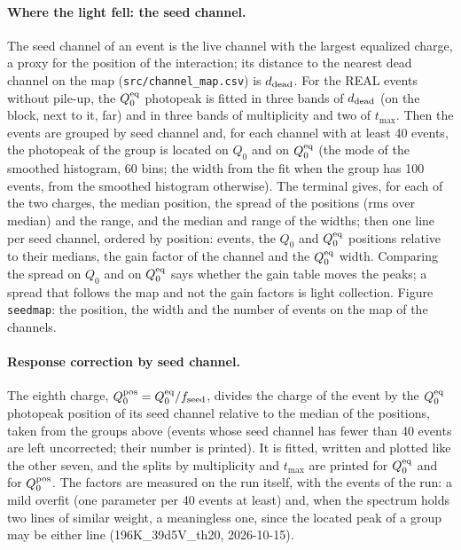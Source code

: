 \documentclass[11pt]{article}
\newcommand{\code}[1]{\texttt{#1}}
\begin{document}
\paragraph{Where the light fell: the seed channel.} The seed channel of
an event is the live channel with the largest equalized charge, a proxy
for the position of the interaction; its distance to the nearest dead
channel on the map (\code{src/channel\_map.csv}) is $d_{\rm dead}$. For
the REAL events without pile-up, the $Q^{\rm eq}_0$ photopeak is fitted in
three bands of $d_{\rm dead}$ (on the block, next to it, far) and in three
bands of multiplicity and two of $t_{\max}$. Then the events are grouped
by seed channel and, for each channel with at least 40 events, the
photopeak of the group is located on $Q_0$ and on $Q^{\rm eq}_0$ (the
mode of the smoothed histogram, 60 bins; the width from the fit when the
group has 100 events, from the smoothed histogram otherwise). The
terminal gives, for each of the two charges, the median position, the
spread of the positions (rms over median) and the range, and the median
and range of the widths; then one line per seed channel, ordered by
position: events, the $Q_0$ and $Q^{\rm eq}_0$ positions relative to
their medians, the gain factor of the channel and the $Q^{\rm eq}_0$
width. Comparing the spread on $Q_0$ and on $Q^{\rm eq}_0$ says whether
the gain table moves the peaks; a spread that follows the map and not the
gain factors is light collection. Figure \code{seedmap}: the position, the
width and the number of events on the map of the channels.

\paragraph{Response correction by seed channel.} The eighth charge,
$Q^{\rm pos}_0 = Q^{\rm eq}_0 / f_{\rm seed}$, divides the charge of the
event by the $Q^{\rm eq}_0$ photopeak position of its seed channel
relative to the median of the positions, taken from the groups above
(events whose seed channel has fewer than 40 events are left
uncorrected; their number is printed). It is fitted, written and plotted
like the other seven, and the splits by multiplicity and $t_{\max}$ are
printed for $Q^{\rm eq}_0$ and for $Q^{\rm pos}_0$. The factors are
measured on the run itself, with the events of the run: a mild
overfit (one parameter per 40 events at least) and, when the spectrum
holds two lines of similar weight, a meaningless one, since the located
peak of a group may be either line (196K\_39d5V\_th20, 2026-10-15).
\end{document}
